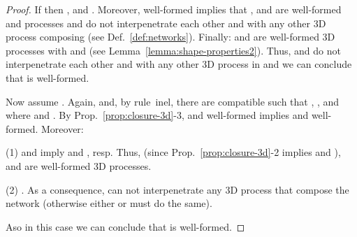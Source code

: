 \documentclass[11pt]{article}
\def\name#1{\mbox{\sc #1}}
\begin{document}
\par\medskip\noindent \begin{proof}
If    then ,  and . Moreover,  well-formed implies that ,  and  are
well-formed and processes  and  do not interpenetrate each other and with any other 3D process
composing  (see Def.~\ref{def:networks}).
Finally:   and  are well-formed 3D processes with  and
 (see Lemma~\ref{lemma:shape-properties2}).
Thus,  and  do not interpenetrate
each other and with any other 3D process in  and we can conclude that  is well-formed.

\par\medskip\noindent Now assume . Again,  and, by rule~\name{inel},  there
are  compatible
such that , ,  and  where  and . By
Prop.~\ref{prop:closure-3d}-3,  and  well-formed implies   and  well-formed. Moreover:

\par\smallskip\noindent (1)  and  imply  and , resp. Thus,  (since Prop.~\ref{prop:closure-3d}-2 implies
 and ),  and  are well-formed 3D processes.

\par\smallskip\noindent (2) . As a consequence,  can
not interpenetrate any 3D process that compose the network  (otherwise either  or  must
do the same).

\par\medskip\noindent Aso in this case we can conclude that  is well-formed.
\end{proof}
\end{document}
